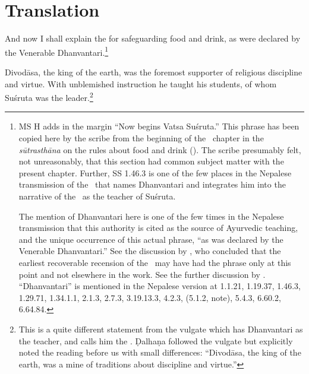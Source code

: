 \newpage

\section{Translation}

\begin{translation}
 \item[1--2]  
 
 And now I shall explain the  for
safeguarding food and drink, as were declared by the Venerable
Dhanvantari.\footnote{MS H adds in the margin  “Now begins Vatsa Suśruta.”  This phrase has been copied
    here by the scribe from the beginning of the \SS\ chapter in the
    \emph{sūtrasthāna} on the rules about food and drink
    ().  The scribe presumably felt, not unreasonably,
    that this section had common subject matter with the present
    chapter.  Further, SS 1.46.3 is one of the few places in the
    Nepalese transmission of the \SS\ that names Dhanvantari and
    integrates him into the narrative of the \SS\ as the teacher of
    Suśruta. %
  
The mention of Dhanvantari here is one of the few times in the Nepalese
transmission that this authority is cited as the source of Ayurvedic
teaching, and the unique occurrence of this actual phrase, “as was
declared by the Venerable Dhanvantari.” See the discussion by
\citet[28--32]{kleb-2021b}, who concluded that the earliest
recoverable recension of the \SS\ may have had the phrase only at this
point and not elsewhere in the work. See the further discussion by
\citet{birc-2021}.  “Dhanvantari” is mentioned in the Nepalese version at 
1.1.21, 1.19.37, 1.46.3, 1.29.71, 1.34.1.1, 2.1.3, 2.7.3, 3.19.13.3, 4.2.3, (5.1.2, 
note), 5.4.3, 6.60.2, 6.64.84.%
}
 
 \item[3] 

 Divodāsa, the king of the earth, was the foremost supporter of religious
discipline and virtue. With unblemished instruction he taught his students, of
whom Suśruta was the leader.\footnote{This is a quite different statement from
the vulgate which has Dhanvantari as the teacher, and calls him the
 \citep[559]{vulgate}.  Ḍalhaṇa followed the vulgate
but explicitly noted the reading before us with small differences:  “Divodāsa, the king of the earth, was a mine of
traditions about discipline and virtue.”}


\end{translation}
